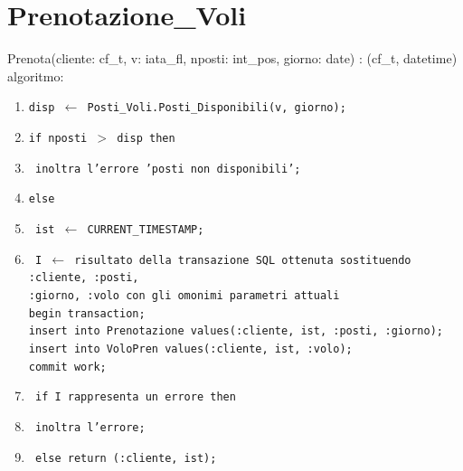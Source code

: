 \documentclass[a4paper,12pt]{report}
\begin{document}
      \section{Prenotazione\_Voli}
        Prenota(cliente: cf\_t, v: iata\_fl, nposti: int\_pos, giorno: date) : (cf\_t, datetime) \\
        \hspace*{1cm}algoritmo:
        \begin{enumerate}[label*=\arabic*]
          \item \texttt{disp $\leftarrow$ Posti\_Voli.Posti\_Disponibili(v, giorno);}
          \item \texttt{if nposti $>$ disp then}
          \item \texttt{\hspace*{1cm} inoltra l'errore 'posti non disponibili';}
          \item \texttt{else}
          \item \texttt{\hspace*{1cm} ist $\leftarrow$ CURRENT\_TIMESTAMP;}
          \item \texttt{\hspace*{1cm} I $\leftarrow$ risultato della transazione SQL ottenuta sostituendo :cliente, :posti, \\
            \hspace*{2cm} :giorno, :volo con gli omonimi parametri attuali \\
            \hspace*{2cm} begin transaction; \\
            \hspace*{2cm} insert into Prenotazione values(:cliente, ist, :posti, :giorno); \\
            \hspace*{2cm} insert into VoloPren values(:cliente, ist, :volo); \\
            \hspace*{2cm} commit work;}
          \item \texttt{\hspace*{1cm} if I rappresenta un errore then}
          \item \texttt{\hspace*{2cm} inoltra l'errore;}
          \item \texttt{\hspace*{1cm} else return (:cliente, ist);}
        \end{enumerate}
\end{document}
